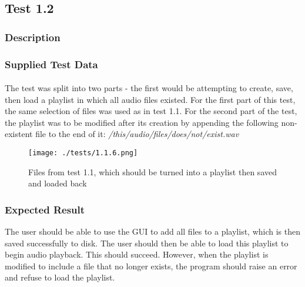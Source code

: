 \pagebreak
\subsection{Test 1.2}
\subsubsection*{Description}
\paragraph{}
{
	\centering
}

\subsubsection*{Supplied Test Data}
\paragraph{}
The test was split into two parts - the first would be attempting to create, save, then load a playlist in which all audio files existed. For the first part of this test, the same selection of files was used as in test 1.1. For the second part of the test, the playlist was to be modified after its creation by appending the following non-existent file to the end of it:
\textit{/this/audio/files/does/not/exist.wav}
\begin{figure}[H]
	\texttt{[image: ./tests/1.1.6.png]}
	\caption{Files from test 1.1, which should be turned into a playlist then saved and loaded back}
\end{figure}

\subsubsection*{Expected Result}
The user should be able to use the GUI to add all files to a playlist, which is then saved successfully to disk. The user should then be able to load this playlist to begin audio playback. This should succeed. However, when the playlist is modified to include a file that no longer exists, the program should raise an error and refuse to load the playlist.

